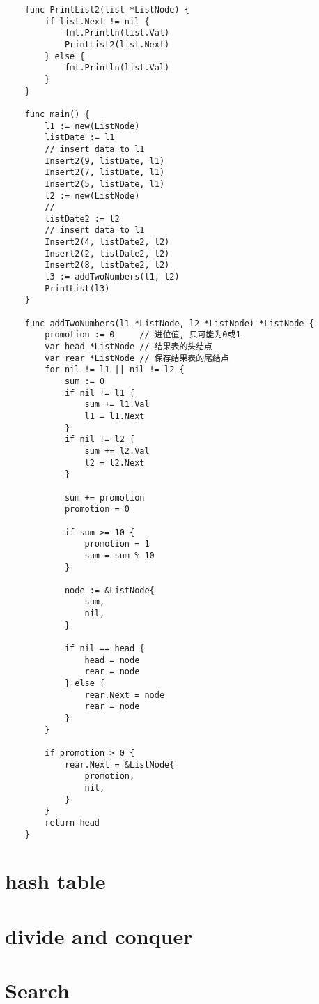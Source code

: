 \documentclass[oneside,12pt,twiside,a4paper]{ctexbook}
\begin{document}
\begin{lstlisting}
    func PrintList2(list *ListNode) {
        if list.Next != nil {
            fmt.Println(list.Val)
            PrintList2(list.Next)
        } else {
            fmt.Println(list.Val)
        }
    }
    
    func main() {
        l1 := new(ListNode)
        listDate := l1
        // insert data to l1
        Insert2(9, listDate, l1)
        Insert2(7, listDate, l1)
        Insert2(5, listDate, l1)
        l2 := new(ListNode)
        //
        listDate2 := l2
        // insert data to l1
        Insert2(4, listDate2, l2)
        Insert2(2, listDate2, l2)
        Insert2(8, listDate2, l2)
        l3 := addTwoNumbers(l1, l2)
        PrintList(l3)
    }
    
    func addTwoNumbers(l1 *ListNode, l2 *ListNode) *ListNode {
        promotion := 0     // 进位值, 只可能为0或1
        var head *ListNode // 结果表的头结点
        var rear *ListNode // 保存结果表的尾结点
        for nil != l1 || nil != l2 {
            sum := 0
            if nil != l1 {
                sum += l1.Val
                l1 = l1.Next
            }
            if nil != l2 {
                sum += l2.Val
                l2 = l2.Next
            }
    
            sum += promotion
            promotion = 0
    
            if sum >= 10 {
                promotion = 1
                sum = sum % 10
            }
    
            node := &ListNode{
                sum,
                nil,
            }
    
            if nil == head {
                head = node
                rear = node
            } else {
                rear.Next = node
                rear = node
            }
        }
    
        if promotion > 0 {
            rear.Next = &ListNode{
                promotion,
                nil,
            }
        }
        return head
    }    
\end{lstlisting}

%
\chapter{hash table}


%
\chapter{divide and conquer}

%
\chapter{Search}
\end{document}
